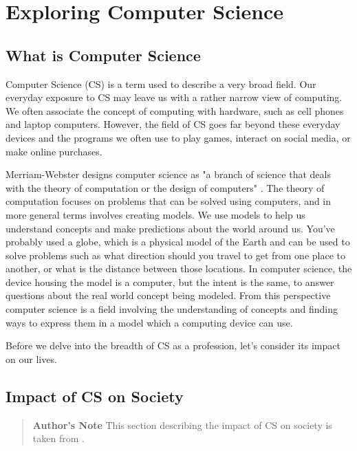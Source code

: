 
\chapter{Exploring Computer Science}

\section{What is Computer Science}

Computer Science (CS) is a term used to describe a very broad field. Our everyday exposure to CS may leave us with a rather narrow view of computing. We often associate the concept of computing with hardware, such as cell phones and laptop computers. However, the field of CS goes far beyond these everyday devices and the programs we often use to play games, interact on social media, or make online purchases.

Merriam-Webster designs computer science as "a branch of science that deals with the theory of computation or the design of computers" \parencite{mw_cs}. The theory of computation focuses on problems that can be solved using computers, and in more general terms involves creating models. We use models to help us understand concepts and make predictions about the world around us. You've probably used a globe, which is a physical model of the Earth and can be used to solve problems such as what direction should you travel to get from one place to another, or what is the distance between those locations. In computer science, the device housing the model is a computer, but the intent is the same, to answer questions about the real world concept being modeled. From this perspective computer science is a field involving the understanding of concepts and finding ways to express them in a model which a computing device can use.

Before we delve into the breadth of CS as a profession, let's consider its impact on our lives.


\section{Impact of CS on Society}


\begin{quotation}
{\bf Author's Note}
This section describing the impact of CS on society is taken from \parencite{read_why_nodate}.
\end{quotation}


